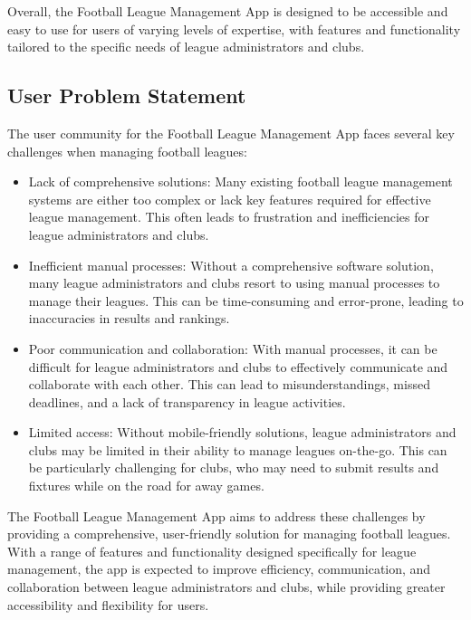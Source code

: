 \documentclass[12pt]{article}
\begin{document}
Overall, the Football League Management App is designed to be accessible and easy to use for users of varying levels of expertise, with features and functionality tailored to the specific needs of league administrators and clubs.
\subsection{ User Problem Statement}
The user community for the Football League Management App faces several key challenges when managing football leagues:
\begin{itemize}
    \item Lack of comprehensive solutions: Many existing football league management systems are either too complex or lack key features required for effective league management. This often leads to frustration and inefficiencies for league administrators and clubs.

    \item Inefficient manual processes: Without a comprehensive software solution, many league administrators and clubs resort to using manual processes to manage their leagues. This can be time-consuming and error-prone, leading to inaccuracies in results and rankings.

    \item Poor communication and collaboration: With manual processes, it can be difficult for league administrators and clubs to effectively communicate and collaborate with each other. This can lead to misunderstandings, missed deadlines, and a lack of transparency in league activities.

    \item Limited access: Without mobile-friendly solutions, league administrators and clubs may be limited in their ability to manage leagues on-the-go. This can be particularly challenging for clubs, who may need to submit results and fixtures while on the road for away games.
\end{itemize}
The Football League Management App aims to address these challenges by providing a comprehensive, user-friendly solution for managing football leagues. With a range of features and functionality designed specifically for league management, the app is expected to improve efficiency, communication, and collaboration between league administrators and clubs, while providing greater accessibility and flexibility for users.
\end{document}
